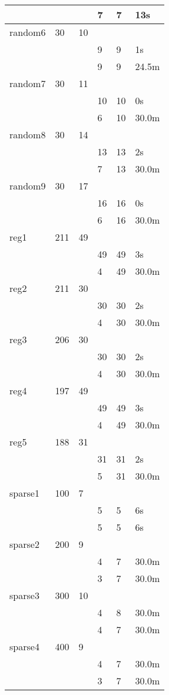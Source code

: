 \begin{table}[]
\begin{tabular}{|lll|l|l|l|}
\cline{4-6}
&&&7  &7 &13s\\
\cline{4-6}
\hline
random6&30&10&&&\\
&&&9  &9 &1s\\
\cline{4-6}
&&&9  &9 &24.5m\\
\cline{4-6}
\hline
random7&30&11&&&\\
&&&10  &10 &0s\\
\cline{4-6}
&&&6  &10 &30.0m\\
\cline{4-6}
\hline
random8&30&14&&&\\
&&&13  &13 &2s\\
\cline{4-6}
&&&7  &13 &30.0m\\
\cline{4-6}
\hline
random9&30&17&&&\\
&&&16  &16 &0s\\
\cline{4-6}
&&&6  &16 &30.0m\\
\cline{4-6}
\hline
reg1&211&49&&&\\
&&&49  &49 &3s\\
\cline{4-6}
&&&4  &49 &30.0m\\
\cline{4-6}
\hline
reg2&211&30&&&\\
&&&30  &30 &2s\\
\cline{4-6}
&&&4  &30 &30.0m\\
\cline{4-6}
\hline
reg3&206&30&&&\\
&&&30  &30 &2s\\
\cline{4-6}
&&&4  &30 &30.0m\\
\cline{4-6}
\hline
reg4&197&49&&&\\
&&&49  &49 &3s\\
\cline{4-6}
&&&4  &49 &30.0m\\
\cline{4-6}
\hline
reg5&188&31&&&\\
&&&31  &31 &2s\\
\cline{4-6}
&&&5  &31 &30.0m\\
\cline{4-6}
\hline
sparse1&100&7&&&\\
&&&5  &5 &6s\\
\cline{4-6}
&&&5  &5 &6s\\
\cline{4-6}
\hline
sparse2&200&9&&&\\
&&&4  &7 &30.0m\\
\cline{4-6}
&&&3  &7 &30.0m\\
\cline{4-6}
\hline
sparse3&300&10&&&\\
&&&4  &8 &30.0m\\
\cline{4-6}
&&&4  &7 &30.0m\\
\cline{4-6}
\hline
sparse4&400&9&&&\\
&&&4  &7 &30.0m\\
\cline{4-6}
&&&3  &7 &30.0m\\
\cline{4-6}
\hline
\bottomrule
\end{tabular}
\end{table}